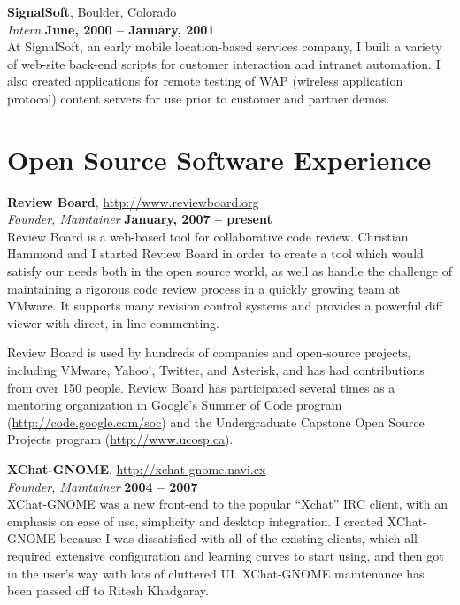 \documentclass[margin,line]{resume}
\begin{document}
\begin{resume}
        {\bf SignalSoft}, Boulder, Colorado \vspace{2mm}\\\vspace{1mm}%
        {\sl Intern} \hfill {\bf June, 2000 -- January, 2001}\\
        At SignalSoft, an early mobile location-based services company, I built a
        variety of web-site back-end scripts for customer interaction and intranet
        automation. I also created applications for remote testing of WAP
        (wireless application protocol) content servers for use prior to customer
        and partner demos.
    \fi

    \ifcv
    \else
        \newpage
    \fi

    \section{\mysidestyle Open Source Software Experience}

    {\bf Review Board}, \url{http://www.reviewboard.org} \vspace{2mm}\\\vspace{1mm}%
    {\sl Founder, Maintainer} \hfill {\bf January, 2007 -- present}\\
    Review Board is a web-based tool for collaborative code review. Christian
    Hammond and I started Review Board in order to create a tool which would
    satisfy our needs both in the open source world, as well as handle the
    challenge of maintaining a rigorous code review process in a quickly growing
    team at VMware. It supports many revision control systems and provides a
    powerful diff viewer with direct, in-line commenting.

    Review Board is used by hundreds of companies and open-source projects,
    including VMware, Yahoo!, Twitter, and Asterisk, and has had contributions
    from over 150 people. Review Board has participated several times as a
    mentoring organization in Google's Summer of Code program
    (\url{http://code.google.com/soc}) and the Undergraduate Capstone Open
    Source Projects program (\url{http://www.ucosp.ca}).

    \ifcv
        \newpage
    \fi

    {\bf XChat-GNOME}, \url{http://xchat-gnome.navi.cx} \vspace{2mm}\\\vspace{1mm}%
    {\sl Founder, Maintainer} \hfill {\bf 2004 -- 2007}\\
    XChat-GNOME was a new front-end to the popular ``Xchat'' IRC client, with an
    emphasis on ease of use, simplicity and desktop integration.  I created
    XChat-GNOME because I was dissatisfied with all of the existing clients,
    which all required extensive configuration and learning curves to start
    using, and then got in the user's way with lots of cluttered UI.
    XChat-GNOME maintenance has been passed off to Ritesh Khadgaray.


\end{resume}
\end{document}
